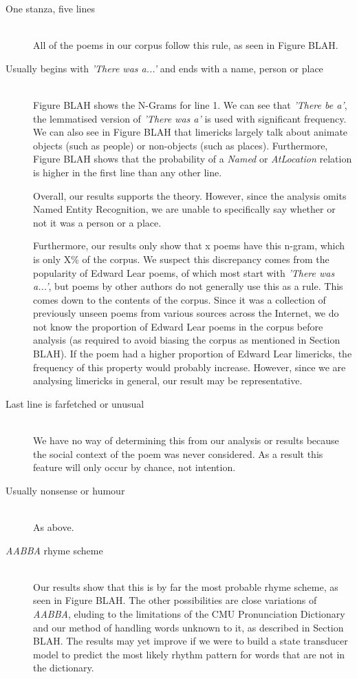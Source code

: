 \begin{description}
\item[One stanza, five lines]  \hfill \\
All of the poems in our corpus follow this rule, as seen in Figure BLAH.


\item[Usually begins with \textit{'There was a...'} and ends with a name, person or place]  \hfill \\
Figure BLAH shows the N-Grams for line 1. We can see that \textit{'There be a'}, the lemmatised version of \textit{'There was a'} is used with significant frequency. We can also see in Figure BLAH that limericks largely talk about animate objects (such as people) or non-objects (such as places). Furthermore, Figure BLAH shows that the probability of a \textit{Named} or \textit{AtLocation} relation is higher in the first line than any other line.

Overall, our results supports the theory. However, since the analysis omits Named Entity Recognition, we are unable to specifically say whether or not it was a person or a place.

Furthermore, our results only show that x poems have this n-gram, which is only X\% of the corpus. We suspect this discrepancy comes from the popularity of Edward Lear poems, of which most start with \textit{'There was a...'}, but poems by other authors do not generally use this as a rule. This comes down to the contents of the corpus. Since it was a collection of previously unseen poems from various sources across the Internet, we do not know the proportion of Edward Lear poems in the corpus before analysis (as required to avoid biasing the corpus as mentioned in Section BLAH). If the poem had a higher proportion of Edward Lear limericks, the frequency of this property would probably increase. However, since we are analysing limericks in general, our result may be representative.

\item[Last line is farfetched or unusual]  \hfill \\
We have no way of determining this from our analysis or results because the social context of the poem was never considered. As a result this feature will only occur by chance, not intention.

\item[Usually nonsense or humour]  \hfill \\
As above.

\item[\textit{AABBA} rhyme scheme]  \hfill \\
Our results show that this is by far the most probable rhyme scheme, as seen in Figure BLAH. The other possibilities are close variations of \textit{AABBA}, eluding to the limitations of the CMU Pronunciation Dictionary and our method of handling words unknown to it, as described in Section BLAH. The results may yet improve if we were to build a state transducer model to predict the most likely rhythm pattern for words that are not in the dictionary.


\end{description}
